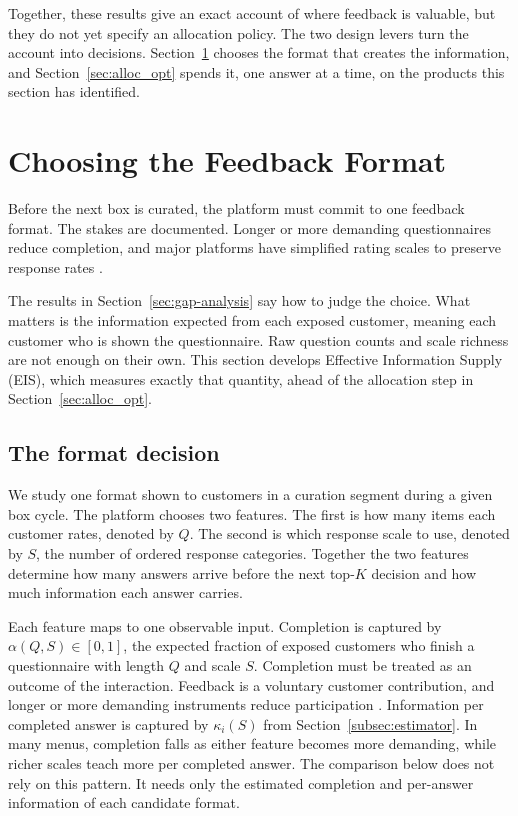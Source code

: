 \documentclass[11pt]{article}
\theoremstyle{definition}
\theoremstyle{remark}
\newcommand{\1}{\mathbf{1}}
\begin{document}
Together, these results give an exact account of where feedback is
valuable, but they do not yet specify an allocation policy. The two
design levers turn the account into decisions.
Section~\ref{sec:feedback_design} chooses the format that creates the
information, and Section~\ref{sec:alloc_opt} spends it, one answer at a
time, on the products this section has identified.

\section{Choosing the Feedback Format}
\label{sec:feedback_design}

Before the next box is curated, the platform must commit to one feedback
format. The stakes are documented. Longer or more demanding
questionnaires reduce completion, and major platforms have simplified
rating scales to preserve response rates
\citep{Krosnick1991,Galesic2009,Rolstad2011,FanYan2010,YouTube2009,Netflix2017}.

The results in Section~\ref{sec:gap-analysis} say how to judge the
choice. What matters is the information expected from each exposed
customer, meaning each customer who is shown the questionnaire. Raw
question counts and scale richness are not enough on their own. This
section develops Effective Information Supply (EIS), which measures
exactly that quantity, ahead of the allocation step in
Section~\ref{sec:alloc_opt}.

\subsection{The format decision}
\label{subsec:design-problem}

We study one format shown to customers in a curation segment during a
given box cycle. The platform chooses two features. The first is how many items each customer
rates, denoted by \(Q\). The second is which response scale to use,
denoted by \(S\), the number of ordered response categories.
Together the two features determine how many answers arrive before the
next top-\(K\) decision and how much information each answer carries.

Each feature maps to one observable input. Completion is captured by
\(\alpha(Q,S)\in[0,1]\), the expected fraction of exposed customers who
finish a questionnaire with length \(Q\) and scale \(S\). Completion must be treated as an outcome of the interaction. Feedback is a voluntary customer contribution, and longer
or more demanding instruments reduce participation
\citep{VerhoefReinartzKrafft2010,VanDoornEtAl2010,PansariKumar2017,Krosnick1991,TourangeauConradCouper2013,DillmanSmythChristian2014,Callegaro2015,RevillaSarisKrosnick2014}.
Information per completed answer is captured by \(\kappa_i(S)\) from
Section~\ref{subsec:estimator}. In many menus, completion falls as either feature becomes more
demanding, while richer scales teach more per completed answer. The comparison below does not rely on this pattern.
It needs only the estimated completion and per-answer information of
each candidate format.
\end{document}
